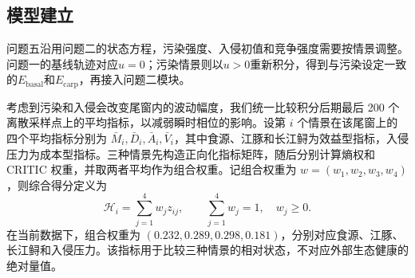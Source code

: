 \subsection{模型建立}
问题五沿用问题二的状态方程，污染强度、入侵初值和竞争强度需要按情景调整。问题一的基线轨迹对应$u=0$；污染情景则以$u>0$重新积分，得到与污染设定一致的$E_{\text{basal}}$和$E_{\text{carp}}$，再接入问题二模块。

考虑到污染和入侵会改变尾窗内的波动幅度，我们统一比较积分后期最后 200 个离散采样点上的平均指标，以减弱瞬时相位的影响。设第 $i$ 个情景在该尾窗上的四个平均指标分别为 $\bar M_i,\bar D_i,\bar A_i,\bar V_i$，其中食源、江豚和长江鲟为效益型指标，入侵压力为成本型指标。三种情景先构造正向化指标矩阵，随后分别计算熵权和 CRITIC 权重，并取两者平均作为组合权重。记组合权重为 $w=(w_1,w_2,w_3,w_4)$，则综合得分定义为
\begin{equation}
\mathcal{H}_i=\sum_{j=1}^{4}w_j z_{ij},\qquad \sum_{j=1}^{4}w_j=1,\quad w_j\ge 0.
\end{equation}
在当前数据下，组合权重为 $(0.232,0.289,0.298,0.181)$，分别对应食源、江豚、长江鲟和入侵压力。该指标用于比较三种情景的相对状态，不对应外部生态健康的绝对量值。

